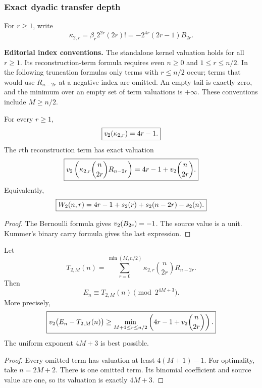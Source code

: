 \subsubsection{Exact dyadic transfer depth}

For \(r\geq1\), write
\[
\kappa_{2,r}
=
\beta_r2^{2r}(2r)!
=
-2^{4r}(2r-1)B_{2r}.
\]

\begin{histtheorem}\label{hist:thm:exact_dyadic_kernel_weight}
\par\noindent\textbf{Editorial index conventions.} The standalone kernel valuation holds for all $r\ge1$. Its reconstruction-term formula requires even $n\ge0$ and $1\le r\le n/2$. In the following truncation formulas only terms with $r\le n/2$ occur; terms that would use $R_{n-2r}$ at a negative index are omitted. An empty tail is exactly zero, and the minimum over an empty set of term valuations is $+\infty$. These conventions include $M\ge n/2$.\par\medskip
For every \(r\geq1\),
\[
\boxed{v_2(\kappa_{2,r})=4r-1.}
\]
The \(r\)th reconstruction term has exact valuation
\[
\boxed{
v_2\left(
\kappa_{2,r}\binom n{2r}R_{n-2r}
\right)
=
4r-1+v_2\binom n{2r}.
}
\]
Equivalently,
\[
\boxed{
W_2(n,r)
=
4r-1+s_2(r)+s_2(n-2r)-s_2(n).
}
\]
\end{histtheorem}

\begin{proof}
The Bernoulli formula gives \(v_2(B_{2r})=-1\). The source value is a unit. Kummer's binary carry formula gives the last expression.
\end{proof}

\begin{histtheorem}\label{hist:thm:optimal_dyadic_truncation}
Let
\[
T_{2,M}(n)
=
\sum_{r=0}^{\min(M,n/2)}
\kappa_{2,r}\binom n{2r}R_{n-2r}.
\]
Then
\[
\boxed{
E_n\equiv T_{2,M}(n)\pmod {2^{4M+3}}.
}
\]
More precisely,
\[
\boxed{
v_2\bigl(E_n-T_{2,M}(n)\bigr)
\geq
\min_{M+1\leq r\leq n/2}
\left(
4r-1+v_2\binom n{2r}
\right).
}
\]
The uniform exponent \(4M+3\) is best possible.
\end{histtheorem}

\begin{proof}
Every omitted term has valuation at least \(4(M+1)-1\). For optimality, take \(n=2M+2\). There is one omitted term. Its binomial coefficient and source value are one, so its valuation is exactly \(4M+3\).
\end{proof}

